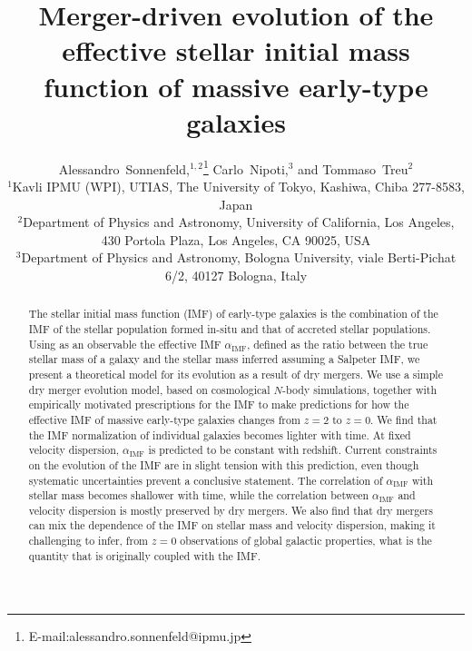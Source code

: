 \documentclass[usenatbib]{mnras}
\def\aimf{\alpha_{\mathrm{IMF}}}
\begin{document}
\title[Evolution of the stellar initial mass function of early-type galaxies]{Merger-driven evolution of the effective stellar initial mass function of massive early-type galaxies}
\author[Sonnenfeld et al.]{
Alessandro~Sonnenfeld,$^{1,2}$\thanks{E-mail:alessandro.sonnenfeld@ipmu.jp}
Carlo~Nipoti,$^{3}$
and Tommaso~Treu$^{2}$
\\
$^{1}$Kavli IPMU (WPI), UTIAS, The University of Tokyo, Kashiwa, Chiba 277-8583, Japan \\
$^{2}$Department of Physics and Astronomy, University of California, Los Angeles, 430 Portola Plaza, Los Angeles, CA 90025, USA \\
$^{3}$Department of Physics and Astronomy, Bologna University, viale Berti-Pichat 6/2, 40127 Bologna, Italy
}

\maketitle

\begin{abstract}
The stellar initial mass function (IMF) of early-type galaxies is the
combination of the IMF of the stellar population formed in-situ and
that of accreted stellar populations.  Using as an observable the
  effective IMF $\aimf$, defined as the ratio between the true stellar
  mass of a galaxy and the stellar mass inferred assuming a Salpeter
  IMF, we present a theoretical model for its evolution as a result
of dry mergers.  We use a simple dry merger evolution model, 
  based on cosmological $N$-body simulations, together with
empirically motivated prescriptions for the IMF to make predictions
for how the effective IMF of massive early-type galaxies changes from
$z=2$ to $z=0$.  We find that the IMF normalization of individual
galaxies becomes lighter with time. At fixed velocity dispersion, $\aimf$ is predicted to be constant with redshift. Current constraints on the
evolution of the IMF are in slight tension with this prediction, even though 
systematic uncertainties prevent a conclusive statement.  The correlation of $\aimf$ with stellar mass becomes
  shallower with time, while the correlation between $\aimf$ and
  velocity dispersion is mostly preserved by dry mergers.  We also
find that dry mergers can mix the dependence of the IMF on stellar
mass and velocity dispersion, making it challenging to infer,
  from $z=0$ observations of global galactic properties, what is the
  quantity that is originally coupled with the IMF.
\end{abstract}
\end{document}
